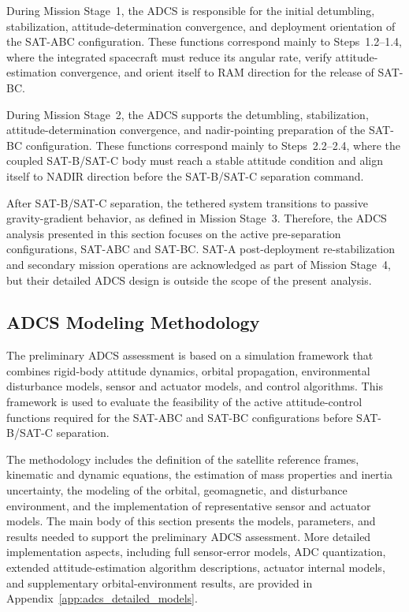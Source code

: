 During Mission Stage~1, the ADCS is responsible for the initial detumbling, stabilization, attitude-determination convergence, and deployment orientation of the SAT-ABC configuration. These functions correspond mainly to Steps~1.2--1.4, where the integrated spacecraft must reduce its angular rate, verify attitude-estimation convergence, and orient itself to RAM direction for the release of SAT-BC.

During Mission Stage~2, the ADCS supports the detumbling, stabilization, attitude-determination convergence, and nadir-pointing preparation of the SAT-BC configuration. These functions correspond mainly to Steps~2.2--2.4, where the coupled SAT-B/SAT-C body must reach a stable attitude condition and align itself to NADIR direction before the SAT-B/SAT-C separation command.

After SAT-B/SAT-C separation, the tethered system transitions to passive gravity-gradient behavior, as defined in Mission Stage~3. Therefore, the ADCS analysis presented in this section focuses on the active pre-separation configurations, SAT-ABC and SAT-BC. SAT-A post-deployment re-stabilization and secondary mission operations are acknowledged as part of Mission Stage~4, but their detailed ADCS design is outside the scope of the present analysis.

\subsection{ADCS Modeling Methodology}
\label{sub:adcs_modeling_methodology}
The preliminary ADCS assessment is based on a simulation framework that combines rigid-body attitude dynamics, orbital propagation, environmental disturbance models, sensor and actuator models, and control algorithms. This framework is used to evaluate the feasibility of the active attitude-control functions required for the SAT-ABC and SAT-BC configurations before SAT-B/SAT-C separation.

The methodology includes the definition of the satellite reference frames, kinematic and dynamic equations, the estimation of mass properties and inertia uncertainty, the modeling of the orbital, geomagnetic, and disturbance environment, and the implementation of representative sensor and actuator models. The main body of this section presents the models, parameters, and results needed to support the preliminary ADCS assessment. More detailed implementation aspects, including full sensor-error models, ADC quantization, extended attitude-estimation algorithm descriptions, actuator internal models, and supplementary orbital-environment results, are provided in Appendix~\ref{app:adcs_detailed_models}.

